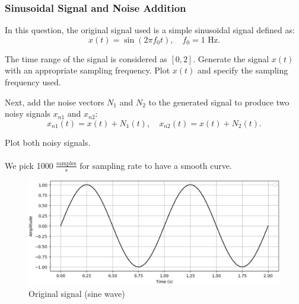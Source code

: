 \documentclass[hidelinks,12pt]{article}
\begin{document}
	\pagebreak
	
	\subsubsection{Sinusoidal Signal and Noise Addition} \label{sec:noise_addition}
	 In this question, the original signal used is a simple sinusoidal signal defined as:
	\[ x(t) = \sin(2\pi f_0 t), \quad f_0 = 1 \text{ Hz}. \]
	
	 The time range of the signal is considered as \([0, 2]\). Generate the signal $x(t)$ with an appropriate sampling frequency. Plot $x(t)$ and specify the sampling frequency used.
	
	 Next, add the noise vectors $N_1$ and $N_2$ to the generated signal to produce two noisy signals $x_{n1}$ and $x_{n2}$:
	\[ x_{n1}(t) = x(t) + N_1(t), \quad x_{n2}(t) = x(t) + N_2(t). \tag{8} \]
	
	 Plot both noisy signals.
	\\ \\
	 We pick 1000 $\frac{\text{samples}}{\text{s}}$ for sampling rate to have a smooth curve.
	
	\begin{figure}[h!]
		\centering
		\includegraphics[scale=0.7]{figures/sin.png}
		\caption{Original signal (sine wave)}
	\end{figure}
	
\end{document}
